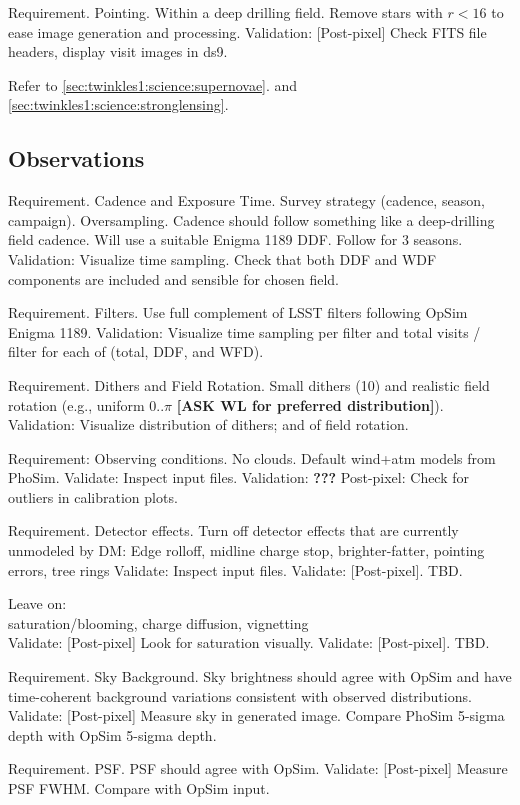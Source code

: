 Requirement. Pointing. 
Within a deep drilling field. Remove stars with $r < 16$ to ease image generation and processing.
Validation: [Post-pixel] Check FITS file headers, display visit images in ds9.  

Refer to \autoref{sec:twinkles1:science:supernovae}.
and \autoref{sec:twinkles1:science:stronglensing}.




\subsection{Observations}

Requirement. Cadence and Exposure Time.
Survey strategy (cadence, season, campaign). Oversampling.
Cadence should follow something like a deep-drilling field cadence.  Will use a suitable Enigma 1189 DDF.
Follow for 3 seasons.
Validation: Visualize time sampling.  Check that both DDF and WDF components are included and sensible for chosen field.

Requirement.  Filters. 
Use full complement of LSST filters following OpSim Enigma 1189.
Validation: Visualize time sampling per filter and total visits / filter for each of (total, DDF, and WFD).

Requirement.  Dithers and Field Rotation.
Small dithers (10\arcsec) and realistic field rotation (e.g., uniform 0..$\pi$ {\bf [ASK WL for preferred distribution]}). 
Validation: Visualize distribution of dithers; and of field rotation.

Requirement:  Observing conditions.
No clouds.  Default wind+atm models from PhoSim.
Validate: Inspect input files.
Validation: {\bf ???}  Post-pixel: Check for outliers in calibration plots.  


Requirement.  Detector effects.
Turn off detector effects that are currently unmodeled by DM:
  Edge rolloff, midline charge stop, brighter-fatter, pointing errors, tree rings
Validate: Inspect input files.
Validate: [Post-pixel].  TBD.

Leave on:\\
saturation/blooming, charge diffusion, vignetting \\
Validate: [Post-pixel] Look for saturation visually.
Validate: [Post-pixel].  TBD.

Requirement. Sky Background.
Sky brightness should agree with OpSim and have time-coherent background variations consistent with observed distributions.
Validate: [Post-pixel] Measure sky in generated image.  Compare PhoSim 5-sigma depth with OpSim 5-sigma depth.

Requirement. PSF.
PSF should agree with OpSim.
Validate: [Post-pixel]  Measure PSF FWHM.  Compare with OpSim input.

